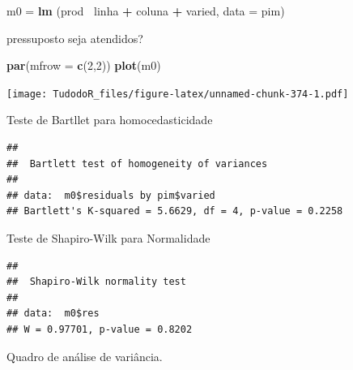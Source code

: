 \documentclass[
]{book}
\newenvironment{Shaded}{\begin{snugshade}}{\end{snugshade}}
\newcommand{\DataTypeTok}[1]{\textcolor[rgb]{0.13,0.29,0.53}{#1}}
\newcommand{\DecValTok}[1]{\textcolor[rgb]{0.00,0.00,0.81}{#1}}
\newcommand{\KeywordTok}[1]{\textcolor[rgb]{0.13,0.29,0.53}{\textbf{#1}}}
\newcommand{\NormalTok}[1]{#1}
\newcommand{\OperatorTok}[1]{\textcolor[rgb]{0.81,0.36,0.00}{\textbf{#1}}}
\newcommand{\StringTok}[1]{\textcolor[rgb]{0.31,0.60,0.02}{#1}}
\begin{document}
\begin{Shaded}
\begin{Highlighting}[]
\NormalTok{m0 =}\StringTok{ }\KeywordTok{lm}\NormalTok{ (prod }\OperatorTok{~}\NormalTok{linha }\OperatorTok{+}\StringTok{ }\NormalTok{coluna }\OperatorTok{+}\StringTok{ }\NormalTok{varied, }\DataTypeTok{data =}\NormalTok{ pim)}
\end{Highlighting}
\end{Shaded}

pressuposto seja atendidos?

\begin{Shaded}
\begin{Highlighting}[]
\KeywordTok{par}\NormalTok{(}\DataTypeTok{mfrow =} \KeywordTok{c}\NormalTok{(}\DecValTok{2}\NormalTok{,}\DecValTok{2}\NormalTok{)) }
\KeywordTok{plot}\NormalTok{(m0)}
\end{Highlighting}
\end{Shaded}

\texttt{[image: TudodoR\_files/figure-latex/unnamed-chunk-374-1.pdf]}

Teste de Bartllet para homocedasticidade

\begin{Shaded}
\end{Shaded}

\begin{verbatim}
## 
##  Bartlett test of homogeneity of variances
## 
## data:  m0$residuals by pim$varied
## Bartlett's K-squared = 5.6629, df = 4, p-value = 0.2258
\end{verbatim}

Teste de Shapiro-Wilk para Normalidade

\begin{Shaded}
\end{Shaded}

\begin{verbatim}
## 
##  Shapiro-Wilk normality test
## 
## data:  m0$res
## W = 0.97701, p-value = 0.8202
\end{verbatim}

Quadro de análise de variância.
\end{document}
